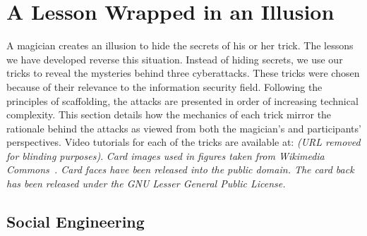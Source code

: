 \section{A Lesson Wrapped in an Illusion}
\label{SEC:background}


A magician creates an illusion to hide the secrets of his or her trick.
The lessons we have developed reverse this situation.
Instead of hiding secrets, we use our tricks to reveal
the mysteries behind
three cyberattacks.
These tricks were chosen because of their relevance to the information
security field. Following the principles of scaffolding, the attacks are presented
in order of increasing technical complexity.
This section details how the mechanics of each trick mirror the
rationale behind the attacks as viewed from both the magician's and
participants' perspectives.  Video tutorials for each of the tricks are
available at: \textit{(URL removed for blinding purposes)}.
\textit{Card images used in figures taken from Wikimedia
Commons~\cite{cardimages}.  Card
faces have been released into the public domain.  The card back has been
released under the GNU Lesser General Public License.}


%
%

\subsection{Social Engineering}

